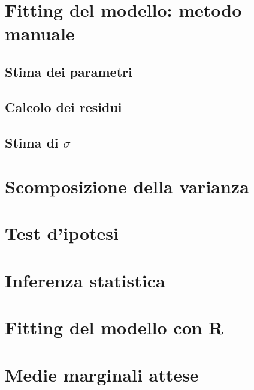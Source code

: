 \documentclass[a4paper,12pt,oneside]{book}
\begin{document}
\hypertarget{fitting-del-modello-metodo-manuale}{%
\section{Fitting del modello: metodo manuale}\label{fitting-del-modello-metodo-manuale}}

\hypertarget{stima-dei-parametri}{%
\subsection{Stima dei parametri}\label{stima-dei-parametri}}

\hypertarget{calcolo-dei-residui}{%
\subsection{Calcolo dei residui}\label{calcolo-dei-residui}}

\hypertarget{stima-di-sigma}{%
\subsection{\texorpdfstring{Stima di \(\sigma\)}{Stima di \textbackslash sigma}}\label{stima-di-sigma}}

\hypertarget{scomposizione-della-varianza}{%
\section{Scomposizione della varianza}\label{scomposizione-della-varianza}}

\hypertarget{test-dipotesi}{%
\section{Test d'ipotesi}\label{test-dipotesi}}

\hypertarget{inferenza-statistica}{%
\section{Inferenza statistica}\label{inferenza-statistica}}

\hypertarget{fitting-del-modello-con-r}{%
\section{Fitting del modello con R}\label{fitting-del-modello-con-r}}

\hypertarget{medie-marginali-attese}{%
\section{Medie marginali attese}\label{medie-marginali-attese}}
\end{document}
